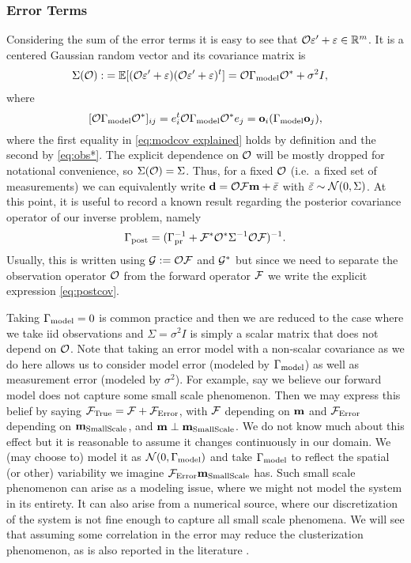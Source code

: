 \documentclass{amsart}
\numberwithin{equation}{section}
\begin{document}
\subsubsection{Error Terms}
Considering the sum of the error terms it is easy to see that $\mathcal{O}
\varepsilon' + \varepsilon \in \mathbb{R}^m$. It is a centered Gaussian random vector and
its covariance matrix is
\begin{align}\label{eq:Sigma}
  \begin{split}
    \Sigma(\mathcal{O}) :&= \mathbb{E}[ (\mathcal{O} \varepsilon' + \varepsilon)  (\mathcal{O} \varepsilon' + \varepsilon)^t ] 
    = \mathcal{O} \Gamma_{\textup{model}} \mathcal{O}^* + \sigma^2I , 
  \end{split}
\end{align}
where
\begin{equation}\label{eq:modcov explained}
  [\mathcal{O} \Gamma_{\textup{model}} \mathcal{O}^*]_{ij} = e_i^t \mathcal{O} \Gamma_{\textup{model}} \mathcal{O}^* e_j = \mathbf{o}_i (\Gamma_{\textup{model}} \mathbf{o}_j),
\end{equation}
where the first equality in \eqref{eq:modcov explained} holds by
definition and the second by \eqref{eq:obs*}. The explicit dependence
on $\mathcal{O}$ will be mostly dropped for notational convenience, so
$\Sigma(\mathcal{O}) = \Sigma$. Thus, for a fixed $\mathcal{O}$ (i.e.\ a fixed set
of measurements) we can equivalently write $\mathbf{d} = \mathcal{O} \mathcal{F} \mathbf{m} +
\bar{\varepsilon}$ with $\bar{\varepsilon} \sim \mathcal{N}(0,\Sigma)$. At this point,
it is useful to record a known result regarding the posterior
covariance operator of our inverse problem, namely
\begin{align}\label{eq:postcov}
  \Gamma_{\textup{post}} = (\Gamma_{\textup{pr}}^{-1} + \mathcal{F}^* \mathcal{O}^* \Sigma^{-1} \mathcal{O} \mathcal{F}
  )^{-1}.
\end{align}
Usually, this is written using $\mathcal{G} := \mathcal{O} \mathcal{F}$ and $\mathcal{G}^*$ but
since we need to separate the observation operator $\mathcal{O}$ from the
forward operator $\mathcal{F}$ we write the explicit expression
\eqref{eq:postcov}.

Taking $\Gamma_{\textup{model}} = 0$ is common practice
\cite{Tarantola05,KaipioSomersalo05,Vogel02} and then we are reduced
to the case where we take iid observations and $\Sigma = \sigma^2I$ is
simply a scalar matrix that does not depend on $\mathcal{O}$. Note that
taking an error model with a non-scalar covariance as we do here
allows us to consider model error (modeled by $\Gamma_{\textup{model}}$) as well as
measurement error (modeled by $\sigma^2$). For example, say we believe
our forward model does not capture some small scale phenomenon.  Then
we may express this belief by saying $\mathcal{F}_{\textup{True}} = \mathcal{F} + \mathcal{F}_{\textup{Error}}$, with $\mathcal{F}$
depending on $\mathbf{m}$ and $\mathcal{F}_{\textup{Error}}$ depending on $\mathbf{m}_{\textup{SmallScale}}$, and $\mathbf{m}
\perp \mathbf{m}_{\textup{SmallScale}}$. We do not know much about this effect but it is
reasonable to assume it changes continuously in our domain. We (may
choose to) model it as $\mathcal{N} (0, \Gamma_{\textup{model}})$ and take $\Gamma_{\textup{model}}$ to
reflect the spatial (or other) variability we imagine $\mathcal{F}_{\textup{Error}} \mathbf{m}_{\textup{SmallScale}}$
has. Such small scale phenomenon can arise as a modeling issue, where
we might not model the system in its entirety. It can also arise from
a numerical source, where our discretization of the system is not fine
enough to capture all small scale phenomena. We will see that assuming
some correlation in the error may reduce the clusterization
phenomenon, as is also reported in the literature \cite{Ucinski05}.
\end{document}
